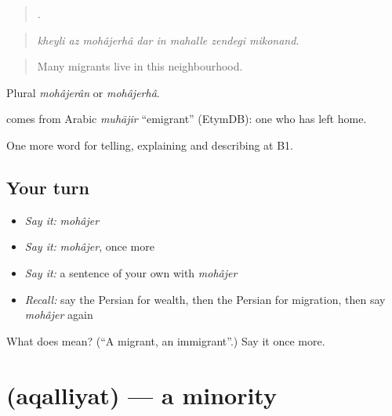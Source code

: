 \begin{quote}
       .
\end{quote}

\begin{quote}
\emph{kheyli az mohâjerhâ dar in mahalle zendegi mikonand.}
\end{quote}

\begin{quote}
Many migrants live in this neighbourhood.
\end{quote}

Plural \emph{mohâjerân} or \emph{mohâjerhâ}.

\begin{cousinweb}
\textbf{} comes from Arabic \emph{muhājir} \textquotedblleft{}emigrant\textquotedblright{} (EtymDB): one who has left home.
\end{cousinweb}

\begin{grammarlens}[title={What you've built}]
One more word for telling, explaining and describing at B1.
\end{grammarlens}

\subsection*{Your turn}
\begin{itemize}
\raggedright
  \item \emph{Say it:} \emph{mohâjer}
  \item \emph{Say it:} \emph{mohâjer}, once more
  \item \emph{Say it:} a sentence of your own with \emph{mohâjer}
  \item \emph{Recall:} say the Persian for wealth, then the Persian for migration, then say \emph{mohâjer} again
\end{itemize}

\begin{tcolorbox}[breakable,colback=teal!4,colframe=teal!35!black,title={Before you move on}]
What does  mean? (\textquotedblleft{}A migrant, an immigrant\textquotedblright{}.) Say it once more.
\end{tcolorbox}
\section[\texorpdfstring{\fa{اقلیت} (aqalliyat)}{اقلیت (aqalliyat)}]{ (aqalliyat) — a minority}

